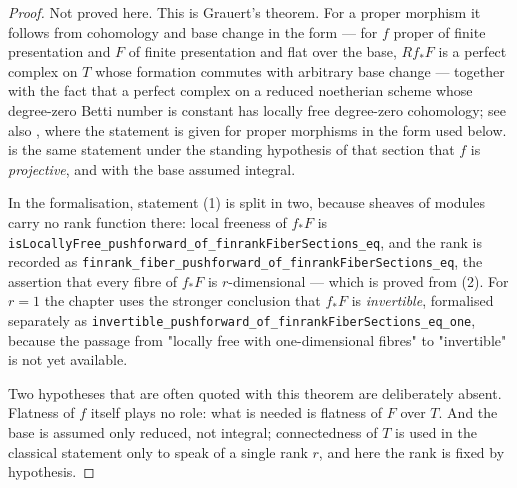 \begin{proof}
Not proved here.  This is Grauert's theorem.  For a proper morphism it follows
from cohomology and base change in the form  --- for $f$
proper of finite presentation and $F$ of finite presentation and flat over the
base, $Rf_*F$ is a perfect complex on $T$ whose formation commutes with
arbitrary base change --- together with the fact that a perfect complex on a
reduced noetherian scheme whose degree-zero Betti number is constant has
locally free degree-zero cohomology; see also
\cite[\S5]{MumfordAbelianVarieties}, where the statement is given for proper
morphisms in the form used below.  \cite[III, Theorem 12.11]{Hartshorne} is
the same statement under the standing hypothesis of that section that $f$ is
\emph{projective}, and with the base assumed integral.

In the formalisation, statement (1) is split in two, because sheaves of
modules carry no rank function there: local freeness of $f_*F$ is
\texttt{isLocallyFree\_pushforward\_of\_finrankFiberSections\_eq}, and the
rank is recorded as
\texttt{finrank\_fiber\_pushforward\_of\_finrankFiberSections\_eq}, the
assertion that every fibre of $f_*F$ is $r$-dimensional --- which is proved
from (2).  For $r=1$ the chapter uses the stronger conclusion that $f_*F$ is
\emph{invertible}, formalised separately as
\texttt{invertible\_pushforward\_of\_finrankFiberSections\_eq\_one}, because
the passage from "locally free with one-dimensional fibres" to "invertible"
is not yet available.

Two hypotheses that are often quoted with this theorem are deliberately
absent.  Flatness of $f$ itself plays no role: what is needed is flatness of
$F$ over $T$.  And the base is assumed only reduced, not integral;
connectedness of $T$ is used in the classical statement only to speak of a
single rank $r$, and here the rank is fixed by hypothesis.
\end{proof}

